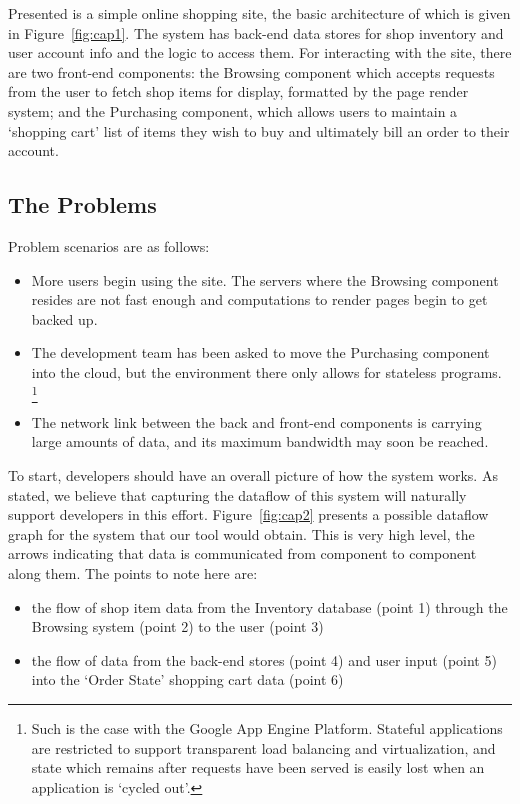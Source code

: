 \documentclass[msc,oneside]{ubcthesis}
\begin{document}
Presented is a simple online shopping site, the basic architecture of which is given in Figure~\ref{fig:cap1}. The system has back-end data stores for shop inventory and user account info and the logic to access them. For interacting with the site, there are two front-end components: the Browsing component which accepts requests from the user to fetch shop items for display, formatted by the page render system; and the Purchasing component, which allows users to maintain a `shopping cart' list of items they wish to buy and ultimately bill an order to their account. 

\subsection{The Problems}

Problem scenarios are as follows:

\begin{itemize}
\item More users begin using the site. The servers where the Browsing component resides are not fast enough and computations to render pages begin to get backed up.
\item The development team has been asked to move the Purchasing component into the cloud, but the environment there only allows for stateless programs. \footnote{Such is the case with the Google App Engine Platform. Stateful applications are restricted to support transparent load balancing and virtualization, and state which remains after requests have been served is easily lost when an application is `cycled out'.}
\item The network link between the back and front-end components is carrying large amounts of data, and its maximum bandwidth may soon be reached.
\end{itemize}

To start, developers should have an overall picture of how the system works. As stated, we believe that capturing the dataflow of this system will naturally support developers in this effort. Figure~\ref{fig:cap2} presents a possible dataflow graph for the system that our tool would obtain. This is very high level, the arrows indicating that data is communicated from component to component along them. The points to note here are:\\

\begin{itemize}
\item the flow of shop item data from the Inventory database (point 1) through the Browsing system (point 2) to the user (point 3)
\item the flow of data from the back-end stores (point 4) and user input (point 5) into the `Order State' shopping cart data (point 6)
\end{itemize}
\end{document}
